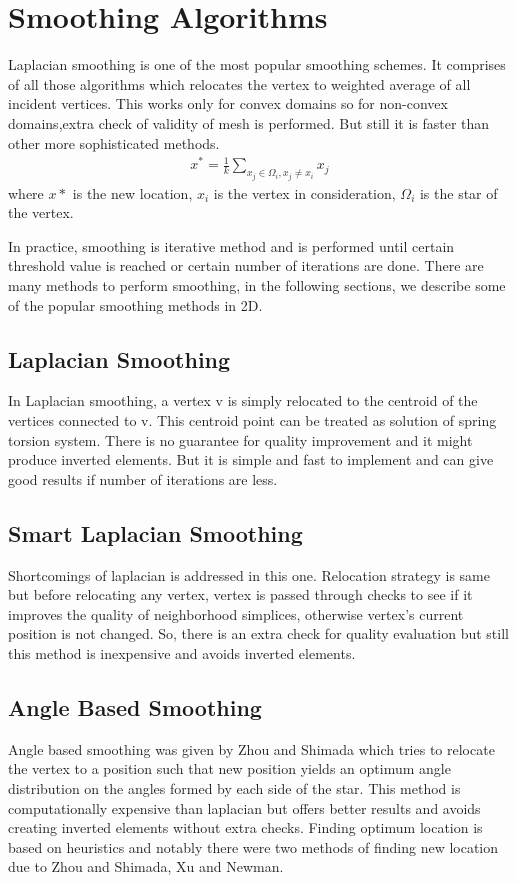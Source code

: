 \section{Smoothing Algorithms}
Laplacian smoothing is one of the most popular smoothing schemes. It comprises of all those algorithms which relocates the vertex to weighted average of all incident vertices. This works only for convex domains so for non-convex domains,extra check of validity of mesh is performed. But still it is faster than other more sophisticated methods. 
\begin{eqnarray}
x^*= \frac{1}{k} \sum_{x_j \in \Omega_i, x_j \neq x_i} x_j
\end{eqnarray}
where $x*$ is the new location, $x_i$ is the vertex in consideration, $\Omega_i$ is the star of the vertex.

In practice, smoothing is iterative method and is performed until certain threshold value is reached or certain number of iterations are done. There are many methods to perform smoothing, in the following sections, we describe some of the popular smoothing methods in 2D. 

\subsection{Laplacian Smoothing}
In Laplacian smoothing, a vertex v is simply relocated to the centroid of the vertices connected to v. This centroid point can be treated as solution of spring torsion system. There is no guarantee for quality improvement and it might produce inverted elements. But it is simple and fast to implement and can give good results if number of iterations are less.

\subsection{Smart Laplacian Smoothing}
Shortcomings of laplacian is addressed in this one. Relocation strategy is same but before relocating any vertex, vertex is passed through checks to see if it improves the quality of neighborhood simplices, otherwise vertex's current position is not changed. So, there is an extra check for quality evaluation but still this method is inexpensive and avoids inverted elements.

\subsection{Angle Based Smoothing}
Angle based smoothing was given by Zhou and Shimada which tries to relocate the vertex to a position such that new position yields an optimum angle distribution on the angles formed by each side of the star.
This method is computationally expensive than laplacian but offers better results and avoids creating inverted elements without extra checks. Finding optimum location is based on heuristics and notably there were two methods of finding new location due to Zhou and Shimada, Xu and Newman.

